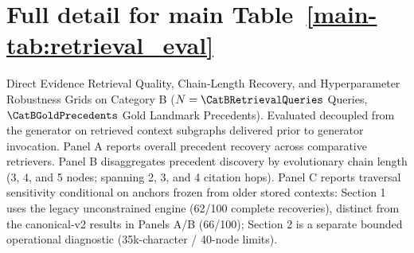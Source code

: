 \clearpage
\section{Full detail for main Table~\ref{main-tab:retrieval_eval}}
\label{detail-tab:retrieval_eval}
Direct Evidence Retrieval Quality, Chain-Length Recovery, and Hyperparameter Robustness Grids on Category B ($N=\CatBRetrievalQueries$ Queries, $\CatBGoldPrecedents$ Gold Landmark Precedents). Evaluated decoupled from the generator on retrieved context subgraphs delivered prior to generator invocation. Panel A reports overall precedent recovery across comparative retrievers. Panel B disaggregates precedent discovery by evolutionary chain length (3, 4, and 5 nodes; spanning 2, 3, and 4 citation hops). Panel C reports traversal sensitivity conditional on anchors frozen from older stored contexts: Section 1 uses the legacy unconstrained engine (62/100 complete recoveries), distinct from the canonical-v2 results in Panels A/B (66/100); Section 2 is a separate bounded operational diagnostic (35k-character / 40-node limits).\par\medskip
